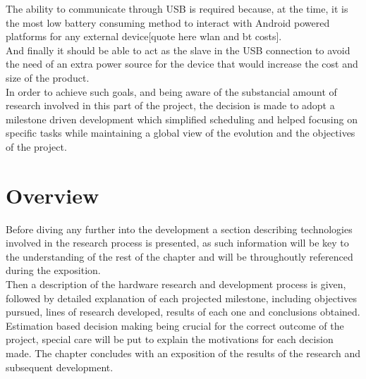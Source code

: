 	The ability to communicate through USB is required because, at the time, it is the most low battery consuming method to interact with Android powered platforms for any external device[quote here wlan and bt costs].\\

	And finally it should be able to act as the slave in the USB connection to avoid the need of an extra power source for the device that would increase the cost and size of the product.\\


	In order to achieve such goals, and being aware of the substancial amount of research involved in this part of the project, the decision is made to adopt a milestone driven development which simplified scheduling and helped focusing on specific tasks while maintaining a global view of the evolution and the objectives of the project.\\

	\section{Overview}

	Before diving any further into the development a section describing technologies involved in the research process is presented, as such information will be key to the understanding of the rest of the chapter and will be throughoutly referenced during the exposition.\\

	Then a description of the hardware research and development process is given, followed by detailed explanation of each projected milestone, including objectives pursued, lines of research developed, results of each one and conclusions obtained. Estimation based decision making being crucial for the correct outcome of the project, special care will be put to explain the motivations for each decision made. The chapter concludes with an exposition of the results of the research and subsequent development.

